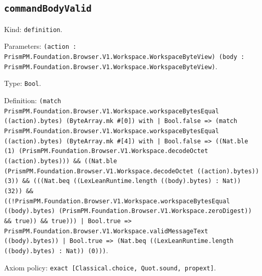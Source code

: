\documentclass[11pt]{article}
\begin{document}
\subsection*{\texttt{commandBodyValid}}
\noindent Kind: \texttt{definition}.\par
\noindent Parameters: \texttt{(action : PrismPM.Foundation.Browser.V1.Workspace.WorkspaceByteView) (body : PrismPM.Foundation.Browser.V1.Workspace.WorkspaceByteView)}.\par
\noindent Type: \texttt{Bool}.\par
\noindent Definition: \texttt{(match PrismPM.Foundation.Browser.V1.Workspace.workspaceBytesEqual ((action).bytes) (ByteArray.mk \#[0]) with | Bool.false => (match PrismPM.Foundation.Browser.V1.Workspace.workspaceBytesEqual ((action).bytes) (ByteArray.mk \#[4]) with | Bool.false => ((Nat.ble (1) (PrismPM.Foundation.Browser.V1.Workspace.decodeOctet ((action).bytes))) \&\& ((Nat.ble (PrismPM.Foundation.Browser.V1.Workspace.decodeOctet ((action).bytes)) (3)) \&\& (((Nat.beq ((LexLeanRuntime.length ((body).bytes) : Nat)) (32)) \&\& ((!PrismPM.Foundation.Browser.V1.Workspace.workspaceBytesEqual ((body).bytes) (PrismPM.Foundation.Browser.V1.Workspace.zeroDigest)) \&\& true)) \&\& true))) | Bool.true => PrismPM.Foundation.Browser.V1.Workspace.validMessageText ((body).bytes)) | Bool.true => (Nat.beq ((LexLeanRuntime.length ((body).bytes) : Nat)) (0)))}.\par
\noindent Axiom policy: \texttt{exact [Classical.choice, Quot.sound, propext]}.\par
\end{document}
